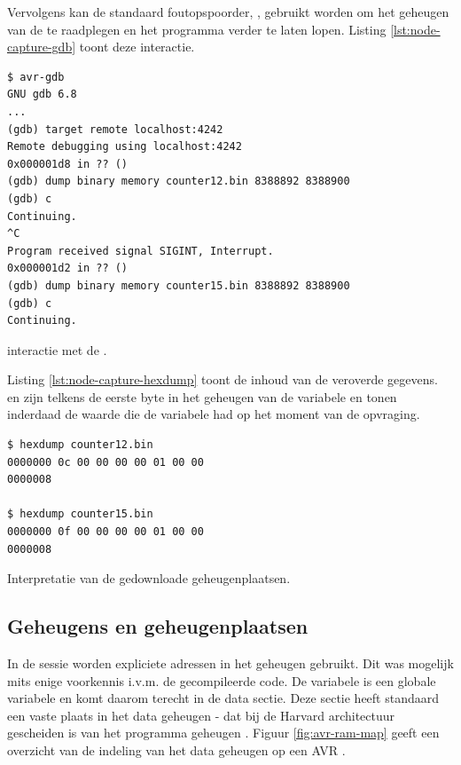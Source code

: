 Vervolgens kan de standaard foutopspoorder, , gebruikt worden om het
geheugen van de \mcu te raadplegen en het programma verder te laten lopen.
Listing \ref{lst:node-capture-gdb} toont deze interactie.

\begin{listing}[ht]
  \begin{verbatim}
$ avr-gdb
GNU gdb 6.8
...
(gdb) target remote localhost:4242
Remote debugging using localhost:4242
0x000001d8 in ?? ()
(gdb) dump binary memory counter12.bin 8388892 8388900
(gdb) c
Continuing.
^C
Program received signal SIGINT, Interrupt.
0x000001d2 in ?? ()
(gdb) dump binary memory counter15.bin 8388892 8388900
(gdb) c
Continuing.
  \end{verbatim}
  \caption{ interactie met de \mcu.}
  \label{lst:node-capture-gdb}
\end{listing}

Listing \ref{lst:node-capture-hexdump} toont de inhoud van de veroverde
gegevens.  en  zijn telkens de eerste byte in het geheugen van
de  variabele en tonen inderdaad de waarde die de variabele had op
het moment van de opvraging.

\begin{listing}[ht]
  \begin{verbatim}
$ hexdump counter12.bin 
0000000 0c 00 00 00 00 01 00 00                        
0000008

$ hexdump counter15.bin 
0000000 0f 00 00 00 00 01 00 00                        
0000008
  \end{verbatim}
  \caption{Interpretatie van de gedownloade geheugenplaatsen.}
  \label{lst:node-capture-hexdump}
\end{listing}

\subsection{Geheugens en geheugenplaatsen}

In de  sessie worden expliciete adressen in het geheugen gebruikt. Dit
was mogelijk mits enige voorkennis i.v.m. de gecompileerde code. De
 variabele is een globale variabele en komt daarom terecht in de
 data sectie. Deze sectie heeft standaard een vaste plaats in het
data geheugen - dat bij de Harvard architectuur gescheiden is van het programma
geheugen \cite{avr-memory}. Figuur \ref{fig:avr-ram-map} geeft een overzicht
van de indeling van het data geheugen op een AVR \mcu.

